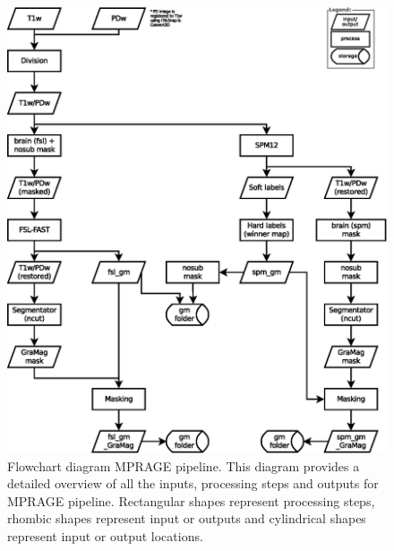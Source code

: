 \begin{figure}[htbp!]
\centering
\includegraphics[width=\textwidth]{figures/chapter_02_SI/figure_S5.eps}
\caption{Flowchart diagram MPRAGE pipeline. This diagram provides a detailed overview of all the inputs, processing steps and outputs for MPRAGE pipeline. Rectangular shapes represent processing steps, rhombic shapes represent input or outputs and cylindrical shapes represent input or output locations.}
\label{S8_Fig}
\end{figure}

